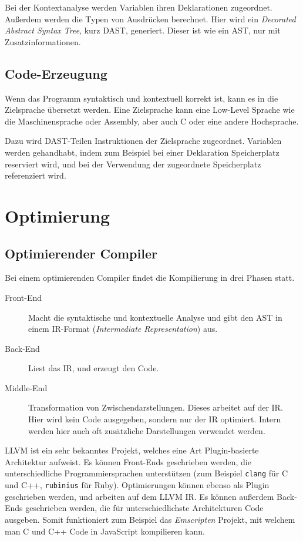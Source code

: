\documentclass[ngerman,abstract=true]{scrartcl}
\begin{document}
Bei der Kontextanalyse werden Variablen ihren Deklarationen zugeordnet. Außerdem werden die Typen von Ausdrücken berechnet. Hier wird ein \emph{Decorated Abstract Syntax Tree}, kurz DAST, generiert. Dieser ist wie ein AST, nur mit Zusatzinformationen.




\subsection{Code-Erzeugung}

Wenn das Programm syntaktisch und kontextuell korrekt ist, kann es in die Zielsprache übersetzt werden. Eine Zielsprache kann eine Low-Level Sprache wie die Maschinensprache oder Assembly, aber auch C oder eine andere Hochsprache.

Dazu wird DAST-Teilen Instruktionen der Zielsprache zugeordnet. Variablen werden gehandhabt, indem zum Beispiel bei einer Deklaration Speicherplatz reserviert wird, und bei der Verwendung der zugeordnete Speicherplatz referenziert wird.

\section{Optimierung}

\subsection{Optimierender Compiler}


Bei einem optimierenden Compiler findet die Kompilierung in drei Phasen statt.

\begin{description}
\item[Front-End] Macht die syntaktische und kontextuelle Analyse und gibt den AST in einem IR-Format (\emph{Intermediate Representation}) aus.
\item[Back-End] Liest das IR, und erzeugt den Code.
\item[Middle-End] Transformation von Zwischendarstellungen. Dieses arbeitet auf der IR. Hier wird kein Code ausgegeben, sondern nur der IR optimiert. Intern werden hier auch oft zusätzliche Darstellungen verwendet werden.
\end{description}

\begin{anmerkung}
LLVM ist ein sehr bekanntes Projekt, welches eine Art Plugin-basierte Architektur aufweist. Es können Front-Ends geschrieben werden, die unterschiedliche Programmiersprachen unterstützen (zum Beispiel \verb|clang| für C und C++, \verb|rubinius| für Ruby). Optimierungen können ebenso als Plugin geschrieben werden, und arbeiten auf dem LLVM IR. Es können außerdem Back-Ends geschrieben werden, die für unterschiedlichste Architekturen Code ausgeben. Somit funktioniert zum Beispiel das \emph{Emscripten} Projekt, mit welchem man C und C++ Code in JavaScript kompilieren kann.
\end{anmerkung}
\end{document}
